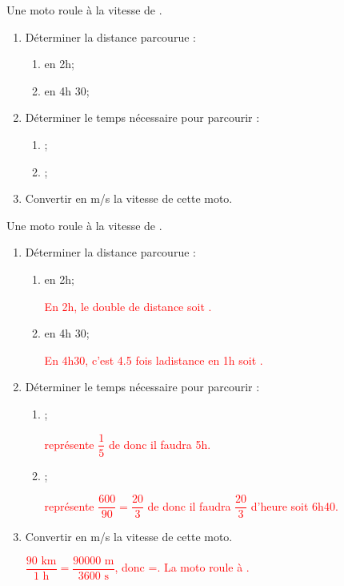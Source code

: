 \begin{exercice*}
    Une moto roule à la vitesse de .
    \begin{enumerate}
        \item Déterminer la distance parcourue :
        \begin{enumerate}
            \item en 2h;
            \item en 4h 30;
        \end{enumerate}
        \item Déterminer le temps nécessaire pour parcourir :
        \begin{enumerate}
            \item {};
            \item {};
        \end{enumerate}
        \item Convertir en m/s la vitesse de cette moto.
    \end{enumerate}
\end{exercice*}
\begin{corrige}
    Une moto roule à la vitesse de .
    \begin{enumerate}
        \item Déterminer la distance parcourue :\\
        \begin{enumerate}
            \item en 2h; \par\textcolor{red}{En 2h, le double de distance soit .}
            \item en 4h 30; \par\textcolor{red}{En 4h30, c'est \num{4.5} fois ladistance en 1h soit .}
        \end{enumerate}
        \setcounter{enumi}{1}
        \item Déterminer le temps nécessaire pour parcourir :\\
        \begin{enumerate}
            \item {};\par\textcolor{red}{ représente $\dfrac15$ de  donc il faudra 5h.}
            \item {};\par\textcolor{red}{ représente $\dfrac{600}{90}=\dfrac{20}{3}$ de  donc il faudra $\dfrac{20}{3}$ d'heure soit 6h40.}
        \end{enumerate}
        \setcounter{enumi}{2}
        \item Convertir en m/s la vitesse de cette moto.\par\textcolor{red}{$\dfrac{90\text{ km}}{1 \text{ h}}=\dfrac{\num{90000}\text{ m}}{\num{3600} \text{ s}}$, donc =. La moto roule à .}
    \end{enumerate}
\end{corrige}

